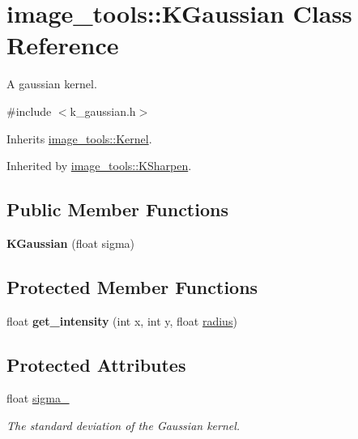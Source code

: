 \hypertarget{classimage__tools_1_1KGaussian}{}\section{image\+\_\+tools\+:\+:K\+Gaussian Class Reference}
\label{classimage__tools_1_1KGaussian}


A gaussian kernel.  




{\ttfamily \#include $<$k\+\_\+gaussian.\+h$>$}



Inherits \hyperlink{classimage__tools_1_1Kernel}{image\+\_\+tools\+::\+Kernel}.



Inherited by \hyperlink{classimage__tools_1_1KSharpen}{image\+\_\+tools\+::\+K\+Sharpen}.

\subsection*{Public Member Functions}
\begin{DoxyCompactItemize}
\item 
{\bfseries K\+Gaussian} (float sigma)\hypertarget{classimage__tools_1_1KGaussian_af915a99f8a1e7bcc6331240844ce3842}{}\label{classimage__tools_1_1KGaussian_af915a99f8a1e7bcc6331240844ce3842}

\end{DoxyCompactItemize}
\subsection*{Protected Member Functions}
\begin{DoxyCompactItemize}
\item 
float {\bfseries get\+\_\+intensity} (int x, int y, float \hyperlink{classimage__tools_1_1Kernel_ac834d16a242dd4a15f5f5e4a6dacea01}{radius})\hypertarget{classimage__tools_1_1KGaussian_abf2ee77d07b4a34f52e15826edb969ce}{}\label{classimage__tools_1_1KGaussian_abf2ee77d07b4a34f52e15826edb969ce}

\end{DoxyCompactItemize}
\subsection*{Protected Attributes}
\begin{DoxyCompactItemize}
\item 
float \hyperlink{classimage__tools_1_1KGaussian_aae4a308fd2f1065b363660681c863eed}{sigma\+\_\+}
\begin{DoxyCompactList}\small\item\em The standard deviation of the Gaussian kernel. \end{DoxyCompactList}\end{DoxyCompactItemize}


